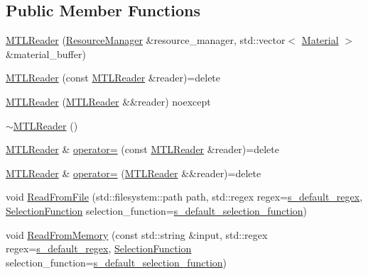 \subsection*{Public Member Functions}
\begin{DoxyCompactItemize}
\item 
\mbox{\hyperlink{classmage_1_1rendering_1_1loader_1_1_m_t_l_reader_a3615f6899de22b53de1bad257ac34099}{M\+T\+L\+Reader}} (\mbox{\hyperlink{classmage_1_1rendering_1_1_resource_manager}{Resource\+Manager}} \&resource\+\_\+manager, std\+::vector$<$ \mbox{\hyperlink{classmage_1_1rendering_1_1_material}{Material}} $>$ \&material\+\_\+buffer)
\item 
\mbox{\hyperlink{classmage_1_1rendering_1_1loader_1_1_m_t_l_reader_ad359e191af9b96e78660ed7aa313a48a}{M\+T\+L\+Reader}} (const \mbox{\hyperlink{classmage_1_1rendering_1_1loader_1_1_m_t_l_reader}{M\+T\+L\+Reader}} \&reader)=delete
\item 
\mbox{\hyperlink{classmage_1_1rendering_1_1loader_1_1_m_t_l_reader_af6b1842f18fb4a6e6bae435fd0f08496}{M\+T\+L\+Reader}} (\mbox{\hyperlink{classmage_1_1rendering_1_1loader_1_1_m_t_l_reader}{M\+T\+L\+Reader}} \&\&reader) noexcept
\item 
\mbox{\hyperlink{classmage_1_1rendering_1_1loader_1_1_m_t_l_reader_a87a4f9bf27cfe8e7e7d0c13c330775d6}{$\sim$\+M\+T\+L\+Reader}} ()
\item 
\mbox{\hyperlink{classmage_1_1rendering_1_1loader_1_1_m_t_l_reader}{M\+T\+L\+Reader}} \& \mbox{\hyperlink{classmage_1_1rendering_1_1loader_1_1_m_t_l_reader_a1153606ce103d9f667726cf5f66a88d1}{operator=}} (const \mbox{\hyperlink{classmage_1_1rendering_1_1loader_1_1_m_t_l_reader}{M\+T\+L\+Reader}} \&reader)=delete
\item 
\mbox{\hyperlink{classmage_1_1rendering_1_1loader_1_1_m_t_l_reader}{M\+T\+L\+Reader}} \& \mbox{\hyperlink{classmage_1_1rendering_1_1loader_1_1_m_t_l_reader_a057f38f1f720e040b2ab5fa08f42fac4}{operator=}} (\mbox{\hyperlink{classmage_1_1rendering_1_1loader_1_1_m_t_l_reader}{M\+T\+L\+Reader}} \&\&reader)=delete
\item 
void \mbox{\hyperlink{classmage_1_1rendering_1_1loader_1_1_m_t_l_reader_aba8857b3d0f49250e312bd737d7d0e9c}{Read\+From\+File}} (std\+::filesystem\+::path path, std\+::regex regex=\mbox{\hyperlink{classmage_1_1_line_reader_a6713da665d123ab39293c0c5a4e8e1de}{s\+\_\+default\+\_\+regex}}, \mbox{\hyperlink{classmage_1_1_line_reader_a17bbae61a3ce30bdb251d6c76e1a4522}{Selection\+Function}} selection\+\_\+function=\mbox{\hyperlink{classmage_1_1_line_reader_a93da10f6f69b44accfec8074712f35de}{s\+\_\+default\+\_\+selection\+\_\+function}})
\item 
void \mbox{\hyperlink{classmage_1_1rendering_1_1loader_1_1_m_t_l_reader_a6411d017fe1c7f30a544e2f0176f14a2}{Read\+From\+Memory}} (const std\+::string \&input, std\+::regex regex=\mbox{\hyperlink{classmage_1_1_line_reader_a6713da665d123ab39293c0c5a4e8e1de}{s\+\_\+default\+\_\+regex}}, \mbox{\hyperlink{classmage_1_1_line_reader_a17bbae61a3ce30bdb251d6c76e1a4522}{Selection\+Function}} selection\+\_\+function=\mbox{\hyperlink{classmage_1_1_line_reader_a93da10f6f69b44accfec8074712f35de}{s\+\_\+default\+\_\+selection\+\_\+function}})
\end{DoxyCompactItemize}
